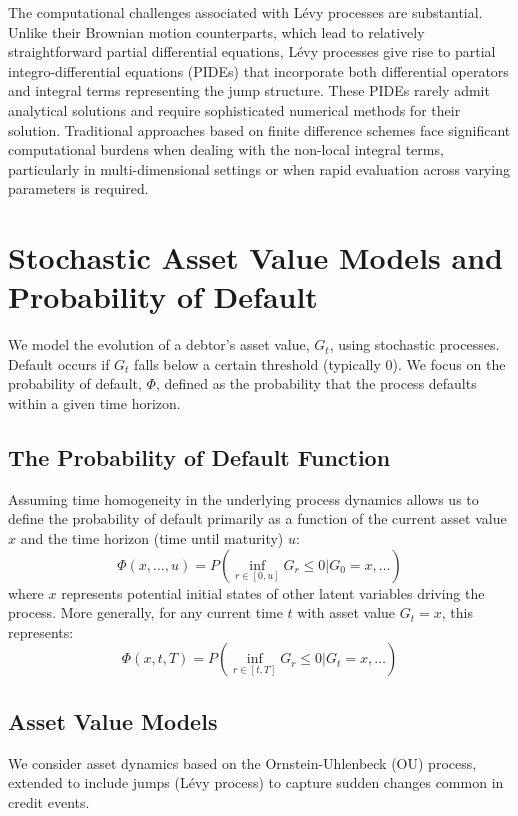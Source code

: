 \documentclass[11pt,twoside,openright]{report}
\begin{document}
The computational challenges associated with Lévy processes are substantial. Unlike their Brownian motion counterparts, which lead to relatively straightforward partial differential equations, Lévy processes give rise to partial integro-differential equations (PIDEs) that incorporate both differential operators and integral terms representing the jump structure. These PIDEs rarely admit analytical solutions and require sophisticated numerical methods for their solution. Traditional approaches based on finite difference schemes face significant computational burdens when dealing with the non-local integral terms, particularly in multi-dimensional settings or when rapid evaluation across varying parameters is required.

\section{Stochastic Asset Value Models and Probability of Default}

We model the evolution of a debtor's asset value, $G_t$, using stochastic processes. Default occurs if $G_t$ falls below a certain threshold (typically 0). We focus on the probability of default, $\Phi$, defined as the probability that the process defaults within a given time horizon.

\subsection{The Probability of Default Function}
Assuming time homogeneity in the underlying process dynamics allows us to define the probability of default primarily as a function of the current asset value $x$ and the time horizon (time until maturity) $u$:
\begin{equation}
\Phi(x, \dots, u) = P\left( \inf_{r \in [0, u]} G_r \le 0 | G_0 = x, \dots \right)
\label{eq:pd_function_basic}
\end{equation}
where $x$ represents potential initial states of other latent variables driving the process. More generally, for any current time $t$ with asset value $G_t = x$, this represents:
\begin{equation}
\Phi(x, t, T) = P\left( \inf_{r \in [t, T]} G_r \le 0 | G_t = x, \dots \right)
\label{eq:pd_function_general}
\end{equation}

\subsection{Asset Value Models}
We consider asset dynamics based on the Ornstein-Uhlenbeck (OU) process, extended to include jumps (Lévy process) to capture sudden changes common in credit events.
\end{document}
